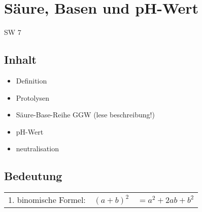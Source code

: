 \section{Säure, Basen und pH-Wert} {SW 7}

\subsection{Inhalt}
\begin{itemize}
\item Definition
\item Protolysen
\item Säure-Base-Reihe GGW (lese beschreibung!)
\item pH-Wert
\item  neutralisation
\end{itemize}

\subsection{Bedeutung}

\begin{tabular}{lll}
	1. binomische Formel: & $(a+b)^2$ & $= a^2 + 2ab+b^2$ \\
\end{tabular}